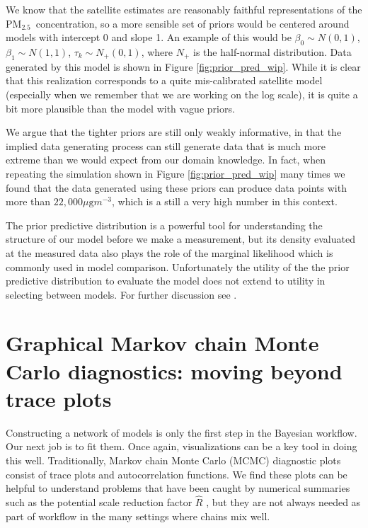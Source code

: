 \documentclass{statsoc}
\newcommand{\PM}{PM$_{2.5}$}
\begin{document}
We know that the satellite estimates are reasonably faithful representations of
the \PM\ concentration, so a more sensible set of priors would be centered
around models with intercept 0 and slope 1.  An example of this would be
$\beta_0 \sim N(0,1)$, $\beta_1 \sim N(1,1)$, $\tau_k \sim N_+(0,1)$, 
where $N_+$ is the half-normal distribution. Data generated 
by this model is shown in Figure \ref{fig:prior_pred_wip}. While it
is clear that this realization corresponds to a quite mis-calibrated satellite
model (especially when we remember that we are working on the log scale), it is
quite a bit more plausible than the model with vague priors.

We argue that the tighter priors are still only {weakly} informative, in that
the implied data generating process can still generate data that is much more
extreme than we would expect from our domain knowledge.  In fact, when repeating
the simulation shown in Figure \ref{fig:prior_pred_wip} many times we found that
the data generated using these priors can produce data points with more than
$22,\!000 \mu\text{g}m^{-3}$, which is a still a very high number in this
context.

The prior predictive distribution is a powerful tool for understanding the
structure of our model before we make a measurement, but its density evaluated
at the measured data also plays the role of the marginal likelihood which is
commonly used in model comparison.  Unfortunately the utility of the the prior
predictive distribution to evaluate the model does not extend to utility in
selecting between models.  For further discussion see \citet{gelman2017priors}.


\section{Graphical Markov chain Monte Carlo diagnostics: moving beyond trace plots}
\label{sec:mcmc}

Constructing a network of models is only the first step in the Bayesian
workflow. Our next job is to fit them. Once again, visualizations can be a key
tool in doing this well. Traditionally, Markov chain Monte Carlo (MCMC)
diagnostic plots consist of trace plots and autocorrelation functions.  We find
these plots can be helpful to understand problems that have been caught by
numerical summaries such as the potential scale reduction factor $\widehat{R}$
\citep[Section 30.3]{stanmanual}, but they are not always needed as part of
workflow in the many settings where chains mix well.
\end{document}
